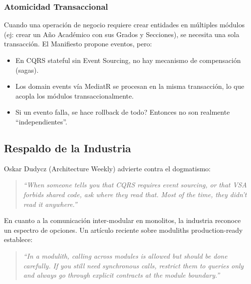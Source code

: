 \documentclass[12pt,a4paper]{article}
\begin{document}
\subsubsection{Atomicidad Transaccional}
Cuando una operaci\'on de negocio requiere crear entidades en m\'ultiples m\'odulos (ej: crear un A\~no Acad\'emico con sus Grados y Secciones), se necesita una sola transacci\'on. El Manifiesto propone eventos, pero:
\begin{itemize}[leftmargin=2em]
    \item En CQRS stateful sin Event Sourcing, no hay mecanismo de compensaci\'on (sagas).
    \item Los domain events v\'ia MediatR se procesan en la misma transacci\'on, lo que acopla los m\'odulos transaccionalmente.
    \item Si un evento falla, \textquestiondown se hace rollback de todo? Entonces no son realmente ``independientes''.
\end{itemize}

\subsection{Respaldo de la Industria}
Oskar Dudycz (Architecture Weekly) advierte contra el dogmatismo:
\begin{quote}
\textit{``When someone tells you that CQRS requires event sourcing, or that VSA forbids shared code, ask where they read that. Most of the time, they didn't read it anywhere.''}
\end{quote}

En cuanto a la comunicaci\'on inter-modular en monolitos, la industria reconoce un espectro de opciones. Un art\'iculo reciente sobre moduliths production-ready establece:
\begin{quote}
\textit{``In a modulith, calling across modules is allowed but should be done carefully. If you still need synchronous calls, restrict them to queries only and always go through explicit contracts at the module boundary.''}
\end{quote}
\end{document}
